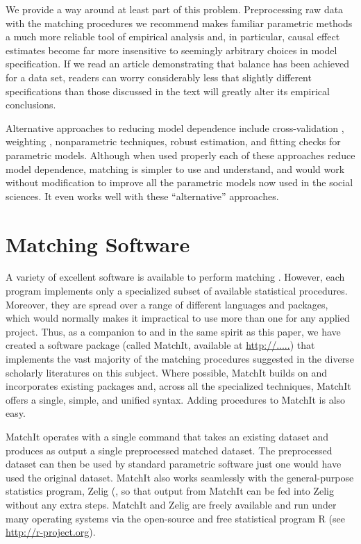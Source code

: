 \documentclass[11pt,titlepage]{article}
\begin{document}
We provide a way around at least part of this problem.  Preprocessing
raw data with the matching procedures we recommend makes familiar
parametric methods a much more reliable tool of empirical analysis
and, in particular, causal effect estimates become far more
insensitive to seemingly arbitrary choices in model specification.  If
we read an article demonstrating that balance has been achieved for a
data set, readers can worry considerably less that slightly different
specifications than those discussed in the text will greatly alter its
empirical conclusions.

Alternative approaches to reducing model dependence include
cross-validation \citep{BlaSmi04}, weighting \citep{RobRot03,
  HirImbRid03}, nonparametric techniques, robust estimation, and
fitting checks for parametric models.  Although when used properly
each of these approaches reduce model dependence, matching is simpler
to use and understand, and would work without modification to improve
all the parametric models now used in the social sciences.  It even
works well with these ``alternative'' approaches.

\appendix
\section{Matching Software}\label{s:matchit}

A variety of excellent software is available to perform matching
\citep{AbaDruLeb02, BecIch02, BerKos03, CumMcKWei03, Hansen05,
  LeuSia04, Parsons00, Parsons01, Sekhon04}.  However, each program
implements only a specialized subset of available statistical
procedures.  Moreover, they are spread over a range of different
languages and packages, which would normally makes it impractical to
use more than one for any applied project.  Thus, as a companion to
and in the same spirit as this paper, we have created a software
package (called MatchIt, available at \url{http://.....})  that
implements the vast majority of the matching procedures suggested in
the diverse scholarly literatures on this subject.  Where possible,
MatchIt builds on and incorporates existing packages and, across all
the specialized techniques, MatchIt offers a single, simple, and
unified syntax.  Adding procedures to MatchIt is also easy.

MatchIt operates with a single command that takes an existing dataset
and produces as output a single preprocessed matched dataset.  The
preprocessed dataset can then be used by standard parametric software
just one would have used the original dataset.  MatchIt also works
seamlessly with the general-purpose statistics program, Zelig
(\citet{ImaKinLau04}, so that output from MatchIt can be fed into
Zelig without any extra steps.  MatchIt and Zelig are freely available
and run under many operating systems via the open-source and free
statistical program R (see \url{http://r-project.org}).
\end{document}
